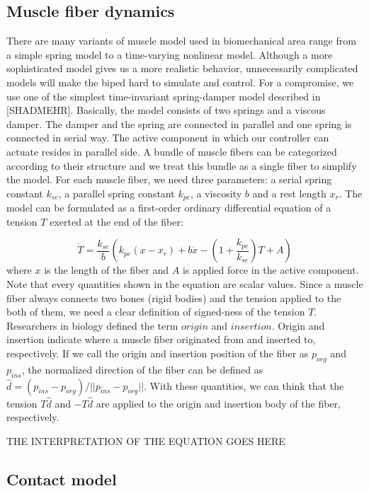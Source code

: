 \documentclass[a4paper,10pt]{article}
\begin{document}
\subsection{Muscle fiber dynamics}

There are many variants of muscle model used in biomechanical area range
from a simple spring model to a time-varying nonlinear model. Although
a more sophisticated model gives us a more realistic behavior, unnecessarily
complicated models will make the biped hard to simulate and control. For a compromise,
we use one of the simplest time-invariant spring-damper model described in [SHADMEHR].
Basically, the model consists of two springs and a viscous damper.
The damper and the spring are connected in parallel and one spring is
connected in serial way. The active component in which our controller
can actuate resides in parallel side. A bundle of muscle fibers can be
categorized according to their structure and we treat this bundle as
a single fiber to simplify the model. For each muscle fiber, we need three
parameters: a serial spring constant $k_{se}$, a parallel spring constant $k_{pe}$,
a viscosity $b$ and a rest length $x_{r}$. The model can be formulated
as a first-order ordinary differential equation of a tension $T$ exerted
at the end of the fiber:

\begin{equation}\label{Tension}
\dot{T} = \frac{k_{se}}{b} \left( k_{pe}(x-x_{r})+b\dot{x}-\left(1+\frac{k_{pe}}{k_{se}}\right)T+A   \right)
\end{equation}
where $x$ is the length of the fiber and $A$ is applied force in the active
component. Note that every quantities shown in the equation are scalar values.
Since a muscle fiber always connects two bones (rigid bodies) and the
tension applied to the both of them, we need a clear definition of signed-ness
of the tension $T$. Researchers in biology defined the term $origin$ and $insertion$.
Origin and insertion indicate where a muscle fiber originated from and inserted
to, respectively. If we call the origin and insertion position of the fiber
as $p_{org}$ and $p_{ins}$, the normalized direction of the fiber can be
defined as $\hat{d}=(p_{ins}-p_{org})/||p_{ins}-p_{org}||$. With these quantities, we can think that
the tension $T\hat{d}$ and $-T\hat{d}$ are applied to the origin and insertion body
of the fiber, respectively.

THE INTERPRETATION OF THE EQUATION GOES HERE

\subsection{Contact model}
\end{document}
